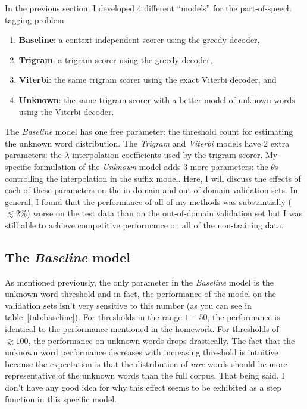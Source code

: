 \documentclass[11pt]{article}
\begin{document}
In the previous section, I developed 4 different ``models'' for the
part-of-speech tagging problem:
\begin{enumerate}
\item{{\bf Baseline}: a context independent scorer using the greedy
      decoder,}
\item{{\bf Trigram}: a trigram scorer using the greedy decoder,}
\item{{\bf Viterbi}: the same trigram scorer using the exact Viterbi decoder,
      and}
\item{{\bf Unknown}: the same trigram scorer with a better model of unknown
      words using the Viterbi decoder.}
\end{enumerate}
The \emph{Baseline} model has one free parameter: the threshold count for
estimating the unknown word distribution.
The \emph{Trigram} and \emph{Viterbi} models have 2 extra parameters: the
$\lambda$ interpolation coefficients used by the trigram scorer.
My specific formulation of the \emph{Unknown} model adds 3 more parameters:
the $\theta$s controlling the interpolation in the suffix model.
Here, I will discuss the effects of each of these parameters on the in-domain
and out-of-domain validation sets.
In general, I found that the performance of all of my methods was
substantially ($\lesssim 2\%$) worse on the test data than on the
out-of-domain validation set but I was still able to achieve competitive
performance on all of the non-training data.

\subsection{The \emph{Baseline} model}

As mentioned previously, the only parameter in the \emph{Baseline} model is
the unknown word threshold and in fact, the performance of the model on the
validation sets isn't very sensitive to this number (as you can see in
table~\ref{tab:baseline}).
For thresholds in the range $1-50$, the performance is identical to the
performance mentioned in the homework.
For thresholds of $\gtrsim 100$, the performance on unknown words drops
drastically.
The fact that the unknown word performance decreases with increasing threshold
is intuitive because the expectation is that the distribution of \emph{rare}
words should be more representative of the unknown words than the full corpus.
That being said, I don't have any good idea for why this effect seems to be
exhibited as a step function in this specific model.
\end{document}
